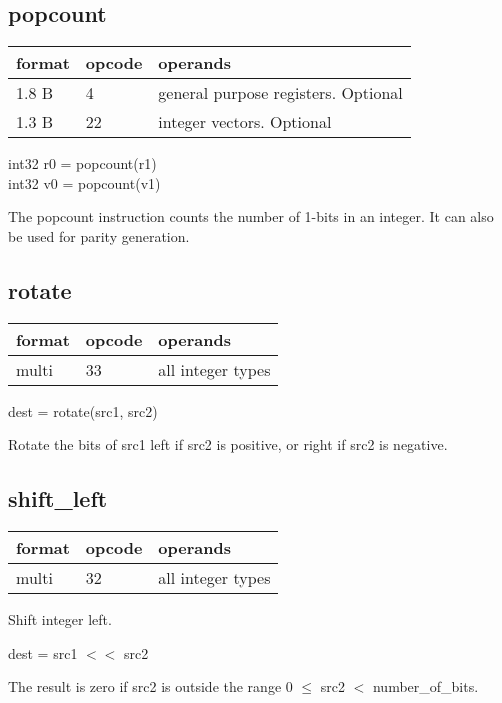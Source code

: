 \documentclass[forwardcom.tex]{subfiles}
\begin{document}
\subsection{popcount}
\label{table:popcountInstruction}
\begin{tabular}{|p{12mm}|p{15mm}|p{100mm}|}
\hline
\bfseries format & \bfseries opcode & \bfseries operands \\ \hline
1.8 B &  4 & general purpose registers. Optional \\ \hline
1.3 B & 22 & integer vectors. Optional \\ \hline
\end{tabular}
\vv

int32 r0 = popcount(r1) \\
int32 v0 = popcount(v1)
\vv

The popcount instruction counts the number of 1-bits in an integer. It can also be used for parity generation.
\vv


\subsection{rotate}
\label{table:rotateInstruction}
\begin{tabular}{|p{12mm}|p{15mm}|p{100mm}|}
\hline
\bfseries format & \bfseries opcode & \bfseries operands \\ \hline
multi & 33 & all integer types \\ \hline
\end{tabular}
\vv

dest = rotate(src1, src2)
\vv

Rotate the bits of src1 left if src2 is positive, or right if src2 is negative.
\vv


\subsection{shift\_left}
\label{table:shiftLeftInstruction}
\begin{tabular}{|p{12mm}|p{15mm}|p{100mm}|}
\hline
\bfseries format & \bfseries opcode & \bfseries operands \\ \hline
multi & 32 & all integer types \\ \hline
\end{tabular}
\vv

Shift integer left.

dest = src1 $<<$ src2
\vv

The result is zero if src2 is outside the range 0 $\leq$ src2 $<$ number\_of\_bits.
\vv
\end{document}
